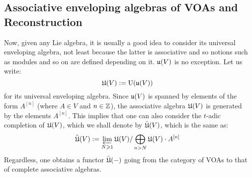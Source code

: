     \subsection{Associative enveloping algebras of VOAs and Reconstruction}
        Now, given any Lie algebra, it is usually a good idea to consider its universal enveloping algebra, not least because the latter is associative and so notions such as modules and so on are defined depending on it. $\mathfrak{u}(V)$ is no exception. Let us write:
            $$\mathfrak{U}(V) := \mathrm{U}(\mathfrak{u}(V))$$
        for its universal enveloping algebra. Since $\mathfrak{u}(V)$ is spanned by elements of the form $A^{[n]}$ (where $A \in V$ and $n \in \mathbb{Z}$), the associative algebra $\mathfrak{U}(V)$ is generated by the elements $A^{[n]}$. This implies that one can also consider the $t$-adic completion of $\mathfrak{U}(V)$, which we shall denote by $\tilde{\mathfrak{U}}(V)$, which is the same as:
            $$\tilde{\mathfrak{U}}(V) := \varprojlim_{N \geqslant 1} \mathfrak{U}(V)/\bigoplus_{n > N} \mathfrak{U}(V) \cdot A^{[n]}$$
        Regardless, one obtains a functor $\tilde{\mathfrak{U}}(-)$ going from the category of VOAs to that of complete associative algebras.
